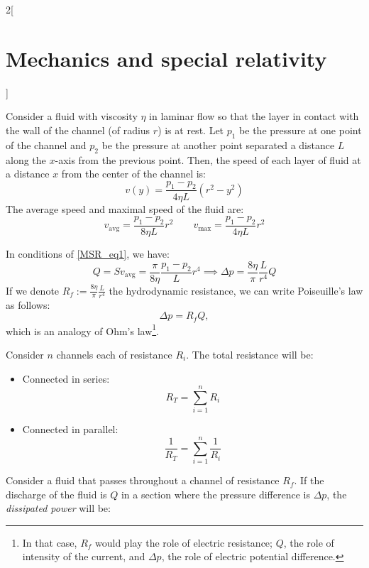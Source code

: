 \documentclass[../../../main.tex]{subfiles}
\begin{document}
\begin{multicols}{2}[\section{Mechanics and special relativity}]
\begin{prop}[Viscosity]
  \end{prop}
  \begin{center}
    \begin{minipage}{\linewidth}
      \centering
      
    \end{minipage}
  \end{center}
  \begin{prop}
    Consider a fluid with viscosity $\eta$ in laminar flow so that the layer in contact with the wall of the channel (of radius $r$) is at rest. Let $p_1$ be the pressure at one point of the channel and $p_2$ be the pressure at another point separated a distance $L$ along the $x$-axis from the previous point. Then, the speed of each layer of fluid at a distance $x$ from the center of the channel is:
    $$v(y)=\frac{p_1-p_2}{4\eta L}(r^2-y^2)$$ The average speed and maximal speed of the fluid are:
    \begin{equation}
      v_\text{avg}=\frac{p_1-p_2}{8\eta L}r^2\qquad v_\text{max}=\frac{p_1-p_2}{4\eta L}r^2
      \label{MSR_eq1}
    \end{equation}
  \end{prop}
  \begin{prop}
    In conditions of \cref{MSR_eq1}, we have: $$Q=Sv_\text{avg}=\frac{\pi}{8\eta }\frac{p_1-p_2}{L}r^4\implies\Delta p=\frac{8\eta}{\pi}\frac{L}{r^4}Q$$ If we denote $\displaystyle R_f:=\frac{8\eta}{\pi}\frac{L}{r^4}$ the hydrodynamic resistance, we can write Poiseuille's law as follows: $$\Delta p=R_f Q,$$ which is an analogy of Ohm's law\footnote{In that case, $R_f$ would play the role of electric resistance; $Q$, the role of intensity of the current, and $\Delta p$, the role of electric potential difference.}.
  \end{prop}
  \begin{prop}
    Consider $n$ channels each of resistance $R_i$. The total resistance will be:
    \begin{itemize}
      \item Connected in series: $$R_T=\sum_{i=1}^nR_i$$
      \item Connected in parallel: $$\frac{1}{R_T}=\sum_{i=1}^n\frac{1}{R_i}$$
    \end{itemize}
  \end{prop}
  \begin{prop}
    Consider a fluid that passes throughout a channel of resistance $R_f$. If the discharge of the fluid is $Q$ in a section where the pressure difference is $\Delta p$, the \textit{dissipated power} will be:

\end{prop}
\end{multicols}
\end{document}
